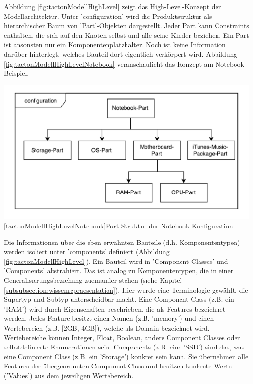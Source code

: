 \documentclass[12pt,a4paper,bibliography=totocnumbered,listof=totoc]{scrartcl}
\begin{document}
Abbildung \ref{fig:tactonModellHighLevel} zeigt das High-Level-Konzept der Modellarchitektur. Unter 'configuration' wird die Produktstruktur als hierarchischer Baum  von 'Part'-Objekten dargestellt. Jeder Part kann Constraints enthalten, die sich auf den Knoten selbst und alle seine Kinder beziehen. Ein Part ist ansonsten nur ein Komponentenplatzhalter. Noch ist keine Information darüber hinterlegt, welches Bauteil dort eigentlich verkörpert wird. Abbildung \ref{fig:tactonModellHighLevelNotebook} veranschaulicht das Konzept am Notebook-Beispiel.

\vspace{1em}
\begin{minipage}{\linewidth}
	\centering
	\includegraphics[width=0.7\linewidth]{Abbildungen/tactonModellHighLevelNotebook.pdf}
	[tactonModellHighLevelNotebook]{Part-Struktur der Notebook-Konfiguration}
	\label{fig:tactonModellHighLevelNotebook}
\end{minipage}
\vspace{1em}

Die Informationen über die eben erwähnten Bauteile (d.h. Komponententypen) werden isoliert unter 'components' definiert (Abbildung \ref{fig:tactonModellHighLevel}). Ein Bauteil wird in 'Component Classes' und 'Components' abstrahiert. Das ist analog zu  Komponententypen, die in einer Generalisierungsbeziehung zueinander stehen (siehe Kapitel \ref{subsubsection:wissenrepraesentation}). Hier wurde eine Terminologie gewählt, die Supertyp und Subtyp unterscheidbar macht. Eine Component Class (z.B. ein 'RAM') wird durch Eigenschaften beschrieben, die als Features bezeichnet werden. Jedes Feature besitzt einen Namen (z.B. 'memory') und einen Wertebereich (z.B. [2GB, 4GB]), welche als Domain bezeichnet wird. Wertebereiche können Integer, Float, Boolean, andere Component Classes oder selbstdefinierte Enumerationen sein. Components (z.B. eine 'SSD') sind das, was eine Component Class (z.B. ein 'Storage') konkret sein kann. Sie übernehmen alle Features der übergeordneten Component Class und besitzen konkrete Werte ('Values') aus dem jeweiligen Wertebereich.
\end{document}
